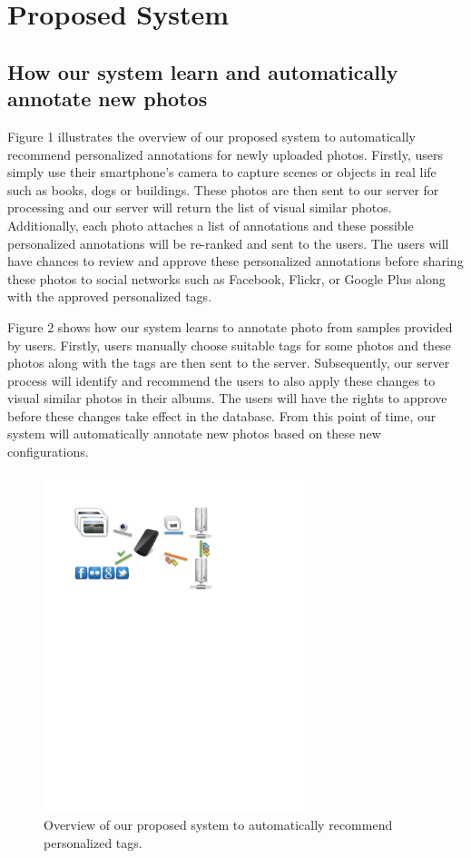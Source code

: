 \section{Proposed System} \label{section:proposed_system}
\subsection {How our system learn and automatically annotate new photos} \label{section:main_flow}
Figure 1 illustrates the overview of our proposed system to automatically recommend personalized annotations for newly uploaded photos. Firstly, users simply use their smartphone’s camera to capture scenes or objects in real life such as books, dogs or buildings. These photos are then sent to our server for processing and our server will return the list of visual similar photos. Additionally, each photo attaches a list of annotations and these possible personalized annotations will be re-ranked and sent to the users. The users will have chances to review and approve these personalized annotations before sharing these photos to social networks such as Facebook, Flickr, or Google Plus along with the approved personalized tags.

Figure 2 shows how our system learns to annotate photo from samples provided by users. Firstly, users manually choose suitable tags for some photos and these photos along with the tags are then sent to the server. Subsequently, our server process will identify and recommend the users to also apply these changes to visual similar photos in their albums. The users will have the rights to approve before these changes take effect in the database. From this point of time, our system will automatically annotate new photos based on these new configurations.

\begin{figure}
    \centering
    \includegraphics[width=3.0in]{flow1.pdf}
    \caption{Overview of our proposed system to automatically recommend personalized tags.}
    \label{fig:flow_1}
\end{figure}

